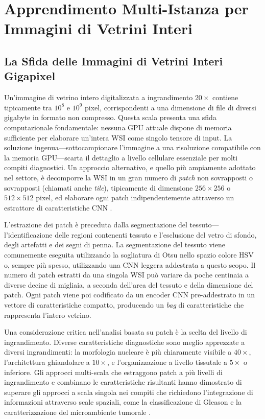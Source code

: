 \section{Apprendimento Multi-Istanza per Immagini di Vetrini Interi}
\label{sec:ch4_mil}

\subsection{La Sfida delle Immagini di Vetrini Interi Gigapixel}

Un'immagine di vetrino intero digitalizzata a ingrandimento $20\times$ contiene tipicamente tra $10^8$ e $10^9$ pixel, corrispondenti a una dimensione di file di diversi gigabyte in formato non compresso. Questa scala presenta una sfida computazionale fondamentale: nessuna GPU attuale dispone di memoria sufficiente per elaborare un'intera WSI come singolo tensore di input. La soluzione ingenua---sottocampionare l'immagine a una risoluzione compatibile con la memoria GPU---scarta il dettaglio a livello cellulare essenziale per molti compiti diagnostici. Un approccio alternativo, e quello più ampiamente adottato nel settore, è decomporre la WSI in un gran numero di \emph{patch} non sovrapposti o sovrapposti (chiamati anche \emph{tile}), tipicamente di dimensione $256 \times 256$ o $512 \times 512$ pixel, ed elaborare ogni patch indipendentemente attraverso un estrattore di caratteristiche CNN \cite{campanella2019}.

L'estrazione dei patch è preceduta dalla segmentazione del tessuto---l'identificazione delle regioni contenenti tessuto e l'esclusione del vetro di sfondo, degli artefatti e dei segni di penna. La segmentazione del tessuto viene comunemente eseguita utilizzando la sogliatura di Otsu nello spazio colore HSV o, sempre più spesso, utilizzando una CNN leggera addestrata a questo scopo. Il numero di patch estratti da una singola WSI può variare da poche centinaia a diverse decine di migliaia, a seconda dell'area del tessuto e della dimensione del patch. Ogni patch viene poi codificato da un encoder CNN pre-addestrato in un vettore di caratteristiche compatto, producendo un \emph{bag} di caratteristiche che rappresenta l'intero vetrino.

Una considerazione critica nell'analisi basata su patch è la scelta del livello di ingrandimento. Diverse caratteristiche diagnostiche sono meglio apprezzate a diversi ingrandimenti: la morfologia nucleare è più chiaramente visibile a $40\times$, l'architettura ghiandolare a $10\times$, e l'organizzazione a livello tissutale a $5\times$ o inferiore. Gli approcci multi-scala che estraggono patch a più livelli di ingrandimento e combinano le caratteristiche risultanti hanno dimostrato di superare gli approcci a scala singola nei compiti che richiedono l'integrazione di informazioni attraverso scale spaziali, come la classificazione di Gleason e la caratterizzazione del microambiente tumorale \cite{bulten2022}.

